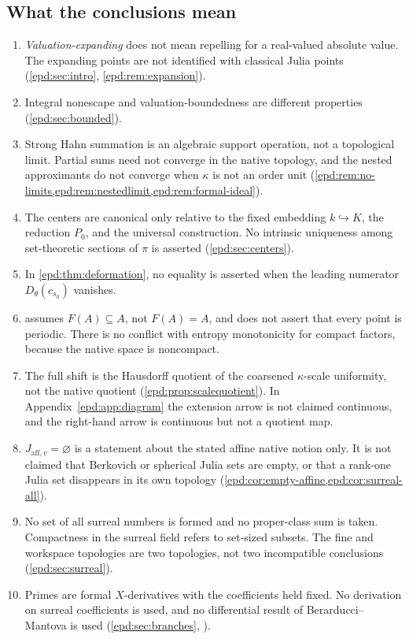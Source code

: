 \documentclass[11pt,a4paper]{article}
\numberwithin{equation}{section}
\theoremstyle{plain}
\theoremstyle{definition}
\theoremstyle{remark}
\begin{document}
\subsection*{What the conclusions mean}
\begin{enumerate}[label=\textbf{S\arabic*.},leftmargin=2.8em,resume]
\item \emph{Valuation-expanding} does not mean repelling for a real-valued
absolute value. The expanding points are not identified with classical
Julia points (\cref{epd:sec:intro}, \cref{epd:rem:expansion}).
\item Integral nonescape and valuation-boundedness are different
properties (\cref{epd:sec:bounded}).
\item Strong Hahn summation is an algebraic support operation, not a
topological limit. Partial sums need not converge in the native topology,
and the nested approximants do not converge when $\kappa$ is not an order
unit (\cref{epd:rem:no-limits,epd:rem:nestedlimit,epd:rem:formal-ideal}).
\item The centers are canonical only relative to the fixed embedding
$k\hookrightarrow K$, the reduction $P_0$, and the universal construction.
No intrinsic uniqueness among set-theoretic sections of $\pi$ is asserted
(\cref{epd:sec:centers}).
\item In \cref{epd:thm:deformation}, no equality is asserted when the
leading numerator $D_\theta(c_{s_0})$ vanishes.
\item {} assumes $F(A)\subseteq A$, not $F(A)=A$, and
does not assert that every point is periodic. There is no conflict with
entropy monotonicity for compact factors, because the native space is
noncompact.
\item The full shift is the Hausdorff quotient of the coarsened
$\kappa$-scale uniformity, not the native quotient
(\cref{epd:prop:scalequotient}). In Appendix~\ref{epd:app:diagram} the extension
arrow is not claimed continuous, and the right-hand arrow is continuous but
not a quotient map.
\item $J_{\mathrm{aff},v}=\varnothing$ is a statement about the stated
affine native notion only. It is not claimed that Berkovich or spherical
Julia sets are empty, or that a rank-one Julia set disappears in its own
topology (\cref{epd:cor:empty-affine,epd:cor:surreal-all}).
\item No set of all surreal numbers is formed and no proper-class sum is
taken. Compactness in the surreal field refers to set-sized subsets. The
fine and workspace topologies are two topologies, not two incompatible
conclusions (\cref{epd:sec:surreal}).
\item Primes are formal $X$-derivatives with the coefficients held fixed.
No derivation on surreal coefficients is used, and no differential result
of Berarducci--Mantova is used (\cref{epd:sec:branches}, \cite{BM}).
\end{enumerate}
\end{document}
